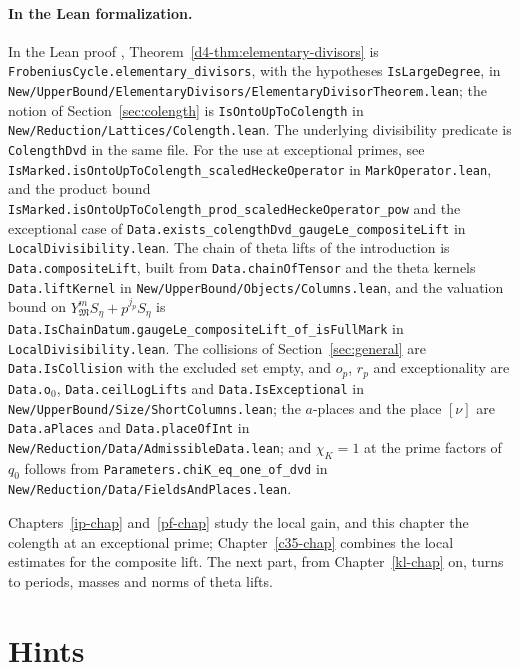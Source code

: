 \documentclass[reqno]{amsart}
\newcounter{chap}
\theoremstyle{definition}
\theoremstyle{plain}
\begin{document}
\paragraph{In the Lean formalization.}
In the Lean proof \cite{GL}, Theorem~\ref{d4-thm:elementary-divisors} is \texttt{FrobeniusCycle.elementary\_divisors}, with the hypotheses \texttt{IsLargeDegree}, in \texttt{New/UpperBound/ElementaryDivisors/ElementaryDivisorTheorem.lean}; the notion of Section~\ref{sec:colength} is \texttt{IsOntoUpToColength} in \texttt{New/Reduction/Lattices/Colength.lean}.  The underlying divisibility predicate is \texttt{ColengthDvd} in the same file.  For the use at exceptional primes, see \texttt{IsMarked.isOntoUpToColength\_scaledHeckeOperator} in \texttt{MarkOperator.lean}, and the product bound \texttt{IsMarked.isOntoUpToColength\_prod\_scaledHeckeOperator\_pow} and the exceptional case of \texttt{Data.exists\_colengthDvd\_gaugeLe\_compositeLift} in \texttt{LocalDivisibility.lean}.  The chain of theta lifts of the introduction is \texttt{Data.compositeLift}, built from \texttt{Data.chainOfTensor} and the theta kernels \texttt{Data.liftKernel} in \texttt{New/UpperBound/Objects/Columns.lean}, and the valuation bound on \(Y_{\mathfrak M}^m S_\eta + p^{j_p} S_\eta\) is \texttt{Data.IsChainDatum.gaugeLe\_\allowbreak compositeLift\_\allowbreak of\_\allowbreak isFullMark} in \texttt{LocalDivisibility.lean}.  The collisions of Section~\ref{sec:general} are \texttt{Data.IsCollision} with the excluded set empty, and \(o_p\), \(r_p\) and exceptionality are \texttt{Data.o}\(_0\), \texttt{Data.ceilLogLifts} and \texttt{Data.IsExceptional} in \texttt{New/UpperBound/Size/ShortColumns.lean}; the \(a\)-places and the place \([\nu]\) are \texttt{Data.aPlaces} and \texttt{Data.placeOfInt} in \texttt{New/Reduction/Data/AdmissibleData.lean}; and \(\chi_K = 1\) at the prime factors of \(q_0\) follows from \texttt{Parameters.chiK\_\allowbreak eq\_\allowbreak one\_\allowbreak of\_\allowbreak dvd} in \texttt{New/Reduction/Data/FieldsAndPlaces.lean}.

Chapters~\ref{ip-chap} and~\ref{pf-chap} study the local gain, and this chapter the colength at an exceptional prime; Chapter~\ref{c35-chap} combines the local estimates for the composite lift.  The next part, from Chapter~\ref{kl-chap} on, turns to periods, masses and norms of theta lifts.

\section*{Hints}
\end{document}
